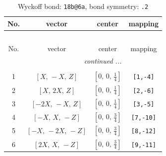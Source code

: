 \documentclass[fleqn,8pt]{jsarticle}
\begin{document}
\begin{longtable}{cccc}
\caption{Wyckoff bond: {\tt 18b@6a}, bond symmetry: {\tt .2}}
 \\
 \hline \hline
No. & vector & center & mapping \\ \hline \endfirsthead

\multicolumn{3}{l}{\tablename\ \thetable{}} \\
 \hline \hline
No. & vector & center & mapping \\ \hline \endhead

 \hline \hline
\multicolumn{3}{r}{\footnotesize\it continued ...} \\ \endfoot

 \hline \hline
\multicolumn{3}{r}{} \\ \endlastfoot

1 & $\left[ X,\, - X,\, Z \right]$ & $\left[ 0,\, 0,\, \frac{1}{4} \right]$ & {\tt [1,-4]} \\ \hline
2 & $\left[ X,\, 2 X,\, Z \right]$ & $\left[ 0,\, 0,\, \frac{1}{4} \right]$ & {\tt [2,-6]} \\ \hline
3 & $\left[ - 2 X,\, - X,\, Z \right]$ & $\left[ 0,\, 0,\, \frac{1}{4} \right]$ & {\tt [3,-5]} \\ \hline
4 & $\left[ - X,\, X,\, - Z \right]$ & $\left[ 0,\, 0,\, \frac{3}{4} \right]$ & {\tt [7,-10]} \\ \hline
5 & $\left[ - X,\, - 2 X,\, - Z \right]$ & $\left[ 0,\, 0,\, \frac{3}{4} \right]$ & {\tt [8,-12]} \\ \hline
6 & $\left[ 2 X,\, X,\, - Z \right]$ & $\left[ 0,\, 0,\, \frac{3}{4} \right]$ & {\tt [9,-11]} \\
\end{longtable}
\renewcommand{\arraystretch}{1.2}
\end{document}
